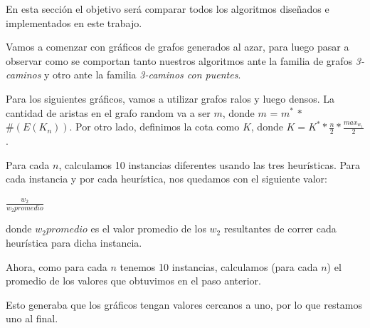 En esta sección el objetivo será comparar todos los algoritmos diseñados e implementados en este trabajo.

Vamos a comenzar con gráficos de grafos generados al azar, para luego pasar a observar como se comportan tanto nuestros algoritmos ante la familia de grafos \emph{3-caminos} y otro ante la familia \emph{3-caminos con puentes}.

Para los siguientes gráficos, vamos a utilizar grafos ralos y luego densos. La cantidad de aristas en el grafo random va a ser $m$, donde $m$ = $m^*$ $*$ $\#(E(K_n))$. Por otro lado, definimos la cota como $K$, donde $K = K^* * \frac{n}{2} * \frac{max_{w_1}}{2}$. 


Para cada $n$, calculamos 10 instancias diferentes usando las tres heurísticas. Para cada instancia y por cada heurística, nos quedamos con el siguiente valor:

\begin{center}
$\frac{w_2}{w_2 promedio}$
\end{center}

donde $w_2 promedio$ es el valor promedio de los $w_2$ resultantes de correr cada heurística para dicha instancia.

Ahora, como para cada $n$ tenemos 10 instancias, calculamos (para cada $n$) el promedio de los valores que obtuvimos en el paso anterior.

Esto generaba que los gráficos tengan valores cercanos a uno, por lo que restamos uno al final.

